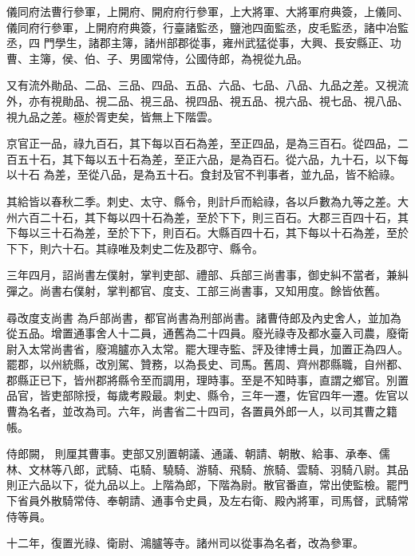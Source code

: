 \begin{pinyinscope}
 儀同府法曹行參軍，上開府、開府府行參軍，上大將軍、大將軍府典簽，上儀同、儀同府行參軍，上開府府典簽，行臺諸監丞，鹽池四面監丞，皮毛監丞，諸中冶監丞，四
 門學生，諸郡主簿，諸州部郡從事，雍州武猛從事，大興、長安縣正、功曹、主簿，侯、伯、子、男國常侍，公國侍郎，為視從九品。



 又有流外勛品、二品、三品、四品、五品、六品、七品、八品、九品之差。又視流外，亦有視勛品、視二品、視三品、視四品、視五品、視六品、視七品、視八品、視九品之差。極於胥吏矣，皆無上下階雲。



 京官正一品，祿九百石，其下每以百石為差，至正四品，是為三百石。從四品，二百五十石，其下每以五十石為差，至正六品，是為百石。從六品，九十石，以下每以十石
 為差，至從八品，是為五十石。食封及官不判事者，並九品，皆不給祿。



 其給皆以春秋二季。刺史、太守、縣令，則計戶而給祿，各以戶數為九等之差。大州六百二十石，其下每以四十石為差，至於下下，則三百石。大郡三百四十石，其下每以三十石為差，至於下下，則百石。大縣百四十石，其下每以十石為差，至於下下，則六十石。其祿唯及刺史二佐及郡守、縣令。



 三年四月，詔尚書左僕射，掌判吏部、禮部、兵部三尚書事，御史糾不當者，兼糾彈之。尚書右僕射，掌判都官、度支、工部三尚書事，又知用度。餘皆依舊。



 尋改度支尚書
 為戶部尚書，都官尚書為刑部尚書。諸曹侍郎及內史舍人，並加為從五品。增置通事舍人十二員，通舊為二十四員。廢光祿寺及都水臺入司農，廢衛尉入太常尚書省，廢鴻臚亦入太常。罷大理寺監、評及律博士員，加置正為四人。罷郡，以州統縣，改別駕、贊務，以為長史、司馬。舊周、齊州郡縣職，自州都、郡縣正已下，皆州郡將縣令至而調用，理時事。至是不知時事，直謂之鄉官。別置品官，皆吏部除授，每歲考殿最。刺史、縣令，三年一遷，佐官四年一遷。佐官以曹為名者，並改為司。六年，尚書省二十四司，各置員外郎一人，以司其曹之籍帳。



 侍郎闕，
 則厘其曹事。吏部又別置朝議、通議、朝請、朝散、給事、承奉、儒林、文林等八郎，武騎、屯騎、驍騎、游騎、飛騎、旅騎、雲騎、羽騎八尉。其品則正六品以下，從九品以上。上階為郎，下階為尉。散官番直，常出使監檢。罷門下省員外散騎常侍、奉朝請、通事令史員，及左右衛、殿內將軍，司馬督，武騎常侍等員。



 十二年，復置光祿、衛尉、鴻臚等寺。諸州司以從事為名者，改為參軍。




\end{pinyinscope}
